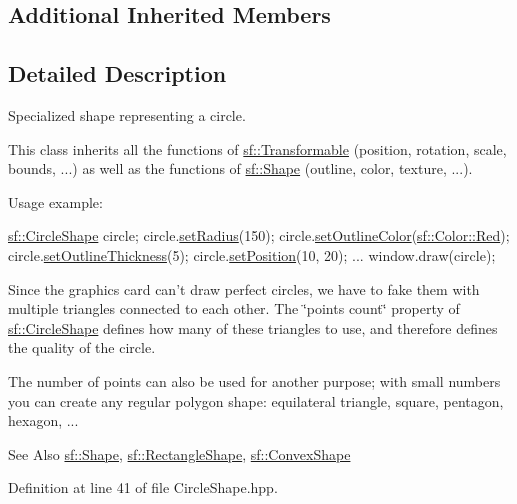 \subsection*{Additional Inherited Members}


\subsection{Detailed Description}
Specialized shape representing a circle. 

This class inherits all the functions of \hyperlink{classsf_1_1_transformable}{sf\-::\-Transformable} (position, rotation, scale, bounds, ...) as well as the functions of \hyperlink{classsf_1_1_shape}{sf\-::\-Shape} (outline, color, texture, ...).

Usage example\-: 
\begin{DoxyCode}
\hyperlink{classsf_1_1_circle_shape}{sf::CircleShape} circle;
circle.\hyperlink{classsf_1_1_circle_shape_a21cdf85fc2f201e10222a241af864be0}{setRadius}(150);
circle.\hyperlink{classsf_1_1_shape_a5978f41ee349ac3c52942996dcb184f7}{setOutlineColor}(\hyperlink{classsf_1_1_color_a127dbf55db9c07d0fa8f4bfcbb97594a}{sf::Color::Red});
circle.\hyperlink{classsf_1_1_shape_a5ad336ad74fc1f567fce3b7e44cf87dc}{setOutlineThickness}(5);
circle.\hyperlink{classsf_1_1_transformable_a4dbfb1a7c80688b0b4c477d706550208}{setPosition}(10, 20);
...
window.draw(circle);
\end{DoxyCode}


Since the graphics card can't draw perfect circles, we have to fake them with multiple triangles connected to each other. The \char`\"{}points count\char`\"{} property of \hyperlink{classsf_1_1_circle_shape}{sf\-::\-Circle\-Shape} defines how many of these triangles to use, and therefore defines the quality of the circle.

The number of points can also be used for another purpose; with small numbers you can create any regular polygon shape\-: equilateral triangle, square, pentagon, hexagon, ...

\begin{DoxySeeAlso}{See Also}
\hyperlink{classsf_1_1_shape}{sf\-::\-Shape}, \hyperlink{classsf_1_1_rectangle_shape}{sf\-::\-Rectangle\-Shape}, \hyperlink{classsf_1_1_convex_shape}{sf\-::\-Convex\-Shape} 
\end{DoxySeeAlso}


Definition at line 41 of file Circle\-Shape.\-hpp.



